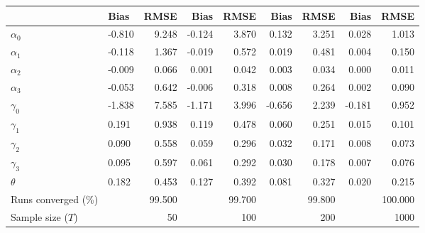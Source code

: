 
\begin{tabular}[t]{llrrrrrrr}
\toprule
  & Bias & RMSE & Bias & RMSE & Bias & RMSE & Bias & RMSE\\
\midrule
$\alpha_{0}$ & -0.810 & 9.248 & -0.124 & 3.870 & 0.132 & 3.251 & 0.028 & 1.013\\
$\alpha_{1}$ & -0.118 & 1.367 & -0.019 & 0.572 & 0.019 & 0.481 & 0.004 & 0.150\\
$\alpha_{2}$ & -0.009 & 0.066 & 0.001 & 0.042 & 0.003 & 0.034 & 0.000 & 0.011\\
$\alpha_{3}$ & -0.053 & 0.642 & -0.006 & 0.318 & 0.008 & 0.264 & 0.002 & 0.090\\
$\gamma_{0}$ & -1.838 & 7.585 & -1.171 & 3.996 & -0.656 & 2.239 & -0.181 & 0.952\\
$\gamma_{1}$ & 0.191 & 0.938 & 0.119 & 0.478 & 0.060 & 0.251 & 0.015 & 0.101\\
$\gamma_{2}$ & 0.090 & 0.558 & 0.059 & 0.296 & 0.032 & 0.171 & 0.008 & 0.073\\
$\gamma_{3}$ & 0.095 & 0.597 & 0.061 & 0.292 & 0.030 & 0.178 & 0.007 & 0.076\\
$\theta$ & 0.182 & 0.453 & 0.127 & 0.392 & 0.081 & 0.327 & 0.020 & 0.215\\
Runs converged (\%) &  & 99.500 &  & 99.700 &  & 99.800 &  & 100.000\\
Sample size ($T$) &  & 50 &  & 100 &  & 200 &  & 1000\\
\bottomrule
\end{tabular}
